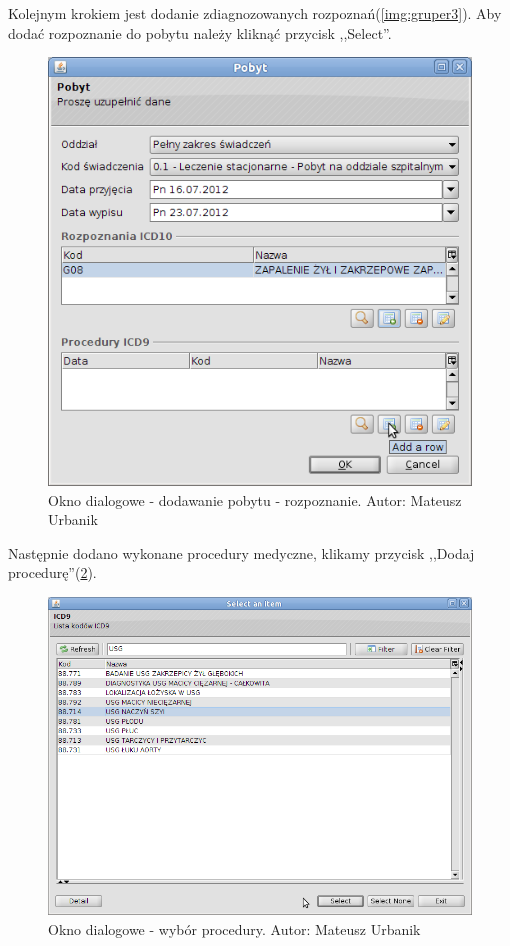 Kolejnym krokiem jest dodanie zdiagnozowanych rozpoznań(\ref{img:gruper3}). Aby dodać rozpoznanie do pobytu należy kliknąć przycisk ,,Select''.

\begin{figure}%
\centering
\includegraphics[scale=0.4]{images/gruper4}
\caption[Widok grupera]{Okno dialogowe - dodawanie pobytu - rozpoznanie. Autor: Mateusz Urbanik}
\label{img:gruper4}
\end{figure}

Następnie dodano wykonane procedury medyczne, klikamy przycisk ,,Dodaj procedurę''(\ref{img:gruper5}).

\begin{figure}%
\centering
\includegraphics[scale=0.4]{images/gruper5}
\caption[Widok grupera]{Okno dialogowe - wybór procedury. Autor: Mateusz Urbanik}
\label{img:gruper5}
\end{figure}

